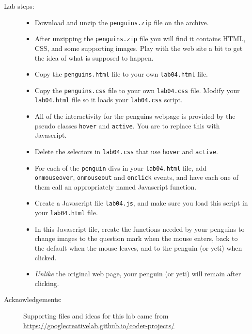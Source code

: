 \documentclass{article}
\begin{document}
\begin{description}
\item[Lab steps:]\mbox{}
  \begin{itemize}
  \item Download and unzip the {\tt penguins.zip} file on the archive.
    \item
  After unzipping the {\tt penguins.zip} file you will find it
  contains HTML, CSS, and some supporting images.  Play with the web
  site a bit to get the idea of what is supposed to happen.
\item
  Copy the {\tt penguins.html} file to your own {\tt lab04.html} file.
\item
  Copy the {\tt penguins.css} file to your own {\tt lab04.css} file.
  Modify your {\tt lab04.html} file so it loads your {\tt lab04.css}
  script. 
\item
All of the interactivity for the penguins webpage is provided by 
the pseudo classes {\tt hover} and {\tt active}.  You are to replace
this with Javascript.
\item Delete the selectors in {\tt lab04.css} that use {\tt hover} and
  {\tt active}.
\item For each of the {\tt penguin} divs in your {\tt lab04.html}
  file, add {\tt onmouseover}, {\tt onmouseout} and
  {\tt onclick} events, and have each
  one of them call an appropriately named Javascript function.
\item Create a Javascript file {\tt lab04.js}, and make sure you load
  this script in your {\tt lab04.html} file.
\item In this Javascript file, create the functions needed by your
    penguins to change images to the question mark when the mouse
    enters, back to the default when the mouse leaves, and to the
    penguin (or yeti) when clicked.
    \item {\em Unlike} the original web page, your penguin (or yeti)
      will remain after clicking.
  \end{itemize}
  


\item[Acknowledgements:] Supporting files and ideas for this lab came
  from\\ \url{https://googlecreativelab.github.io/coder-projects/}


\end{description}
\end{document}
